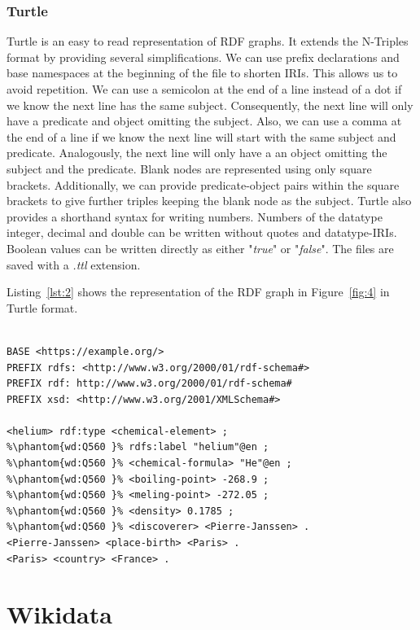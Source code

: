 \subsubsection{Turtle}
\label{subsubsec:turtle}
Turtle \cite{D.Beckett} is an easy to read representation of RDF graphs. It extends the N-Triples format by providing several simplifications. We can use prefix declarations and base namespaces at the beginning of the file to shorten IRIs. This allows us to avoid repetition. We can use a semicolon at the end of a line instead of a dot if we know the next line has the same subject. Consequently, the next line will only have a predicate and object omitting the subject. Also, we can use a comma at the end of a line if we know the next line will start with the same subject and predicate. Analogously, the next line will only have a an object omitting the subject and the predicate. Blank nodes are represented using only square brackets. Additionally, we can provide predicate-object pairs within the square brackets to give further triples keeping the blank node as the subject. Turtle also provides a shorthand syntax for writing numbers. Numbers of the datatype integer, decimal and double can be written without quotes and datatype-IRIs. Boolean values can be written directly as either "\textit{true}" or "\textit{false}". The files are saved with a \textit{.ttl} extension.

Listing~\ref{lst:2} shows the representation of the RDF graph in Figure~\ref{fig:4} in Turtle format. 

\begin{minipage}{\linewidth}
\begin{lstlisting}[label=lst:2, caption={RDF graph represented in Turtle syntax}, language=SPARQL]

BASE <https://example.org/>
PREFIX rdfs: <http://www.w3.org/2000/01/rdf-schema#>
PREFIX rdf: http://www.w3.org/2000/01/rdf-schema#
PREFIX xsd: <http://www.w3.org/2001/XMLSchema#>

<helium> rdf:type <chemical-element> ;
%\phantom{wd:Q560 }% rdfs:label "helium"@en ;
%\phantom{wd:Q560 }% <chemical-formula> "He"@en ;
%\phantom{wd:Q560 }% <boiling-point> -268.9 ;
%\phantom{wd:Q560 }% <meling-point> -272.05 ;
%\phantom{wd:Q560 }% <density> 0.1785 ;
%\phantom{wd:Q560 }% <discoverer> <Pierre-Janssen> .
<Pierre-Janssen> <place-birth> <Paris> .
<Paris> <country> <France> .
\end{lstlisting}
\end{minipage}


\section{Wikidata}

